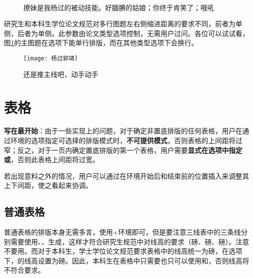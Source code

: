 \documentclass[print, doctor, vlined]{DissertUESTC}
\begin{document}
	\begin{figure}[!htb]
		\centering
		\subfloat[]{
			\texttt{[image: 绿萼2]}
			\label{fig: 绿萼2}
		}
		\hfill
		\\
		\caption{撩妹是我杨过的被动技能。好腼腆的姑娘；你终于肯笑了；哦吼} \label{fig: 被动技能}
	\end{figure}

	研究生和本科生学位论文规范对多行图题左右侧缩进距离的要求不同，前者为单侧\shad{4em}，后者为单侧\shad{2em}。此参数由论文类型选项控制，无需用户过问。各位可以试试看，图\ref{fig: 被动技能}的主图题在选项下能单行排版，而在其他类型选项下会换行。
	
	\begin{figure}[!htb]
		\centering
		\texttt{[image: 杨过郭靖]}
		\caption{还是推主线吧，动手动手}
	\end{figure}
	
	\clearpage
	\section{表格}

	\textbf{写在最开始}：由于一些实现上的问题，对于确定非置底排版的任何表格，用户在通过环境的选项指定可选择的排版模式时，\textbf{不可提供模式}，否则表格的上间距将过窄；反之，对于一页内确定置底排版的第一个表格，用户需要\textbf{显式在选项中指定或}，否则此表格上间距将过宽。

	若出现意料之外的情况，用户可以通过在环境开始后和结束前的位置插入来调整其上下间距，使之看起来协调。
	
	\subsection{普通表格}
	
	普通表格的排版本身无需多言，使用+环境即可，但是要注意三线表中的三条线分别需要使用、、生成，这样才符合研究生规范中对线高的要求（磅、磅、磅）。注意不要用。而对于本科生，学士学位论文规范要求表格中的线高统一为磅，在选项下，的线高设置为磅。因此，本科生在表格中只需要也只可以使用和，否则线高将不符合要求。
	
\end{document}
